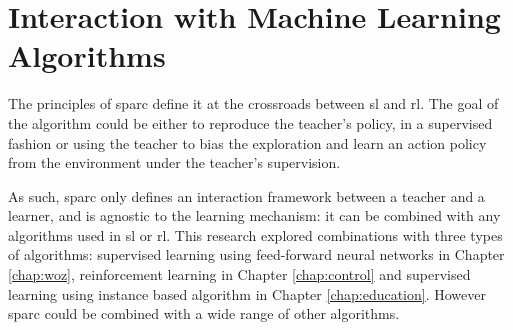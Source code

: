 

\section{Interaction with Machine Learning Algorithms}

The principles of \gls{sparc} define it at the crossroads between \acrlong{sl} and \acrlong{rl}. The  goal of the algorithm could be either to reproduce the teacher's policy, in a supervised fashion or using the teacher to bias the exploration and learn an action policy from the environment under the teacher's supervision.

As such, \gls{sparc} only defines an interaction framework between a teacher and a learner, and is agnostic to the learning mechanism: it can be combined with any algorithms used in \acrlong{sl} or \acrlong{rl}. This research explored combinations with three types of algorithms: supervised learning using feed-forward neural networks in Chapter \ref{chap:woz}, reinforcement learning in Chapter \ref{chap:control} and supervised learning using instance based algorithm in Chapter \ref{chap:education}. However \gls{sparc} could be combined with a wide range of other algorithms.


